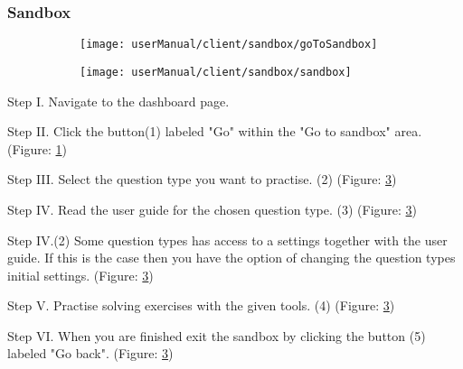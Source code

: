 \subsubsection{Sandbox}
\begin{figure}[H]
	\begin{subfigure}{0.70\linewidth}
		\texttt{[image: userManual/client/sandbox/goToSandbox]}
		\caption{}
		\label{fig:goToSanbox}
	\end{subfigure}
	\begin{subfigure}{0.80\linewidth}
		\texttt{[image: userManual/client/sandbox/sandbox]}
		\caption{}		
		\label{fig:sandbox}
	\end{subfigure}
\end{figure}

\begin{userManualItemlist}
	\item[Step I.] Navigate to the dashboard page.
	\item[Step II.] Click the button(1) labeled "Go" within the "Go to sandbox" area. (Figure: \ref{fig:goToSanbox})
	\item[Step III.] Select the question type you want to practise. (2) (Figure: \ref{fig:sandbox})
	\item[Step IV.] Read the user guide for the chosen question type. (3) (Figure: \ref{fig:sandbox})
	\item[Step IV.(2)] Some question types has access to a settings together with the user guide. If this is the case then you have the option of changing the question types initial settings. (Figure: \ref{fig:sandbox})
	\item[Step V.] Practise solving exercises with the given tools. (4) (Figure: \ref{fig:sandbox})
	\item[Step VI.] When you are finished exit the sandbox by clicking the button (5) labeled "Go back". (Figure: \ref{fig:sandbox})
\end{userManualItemlist}